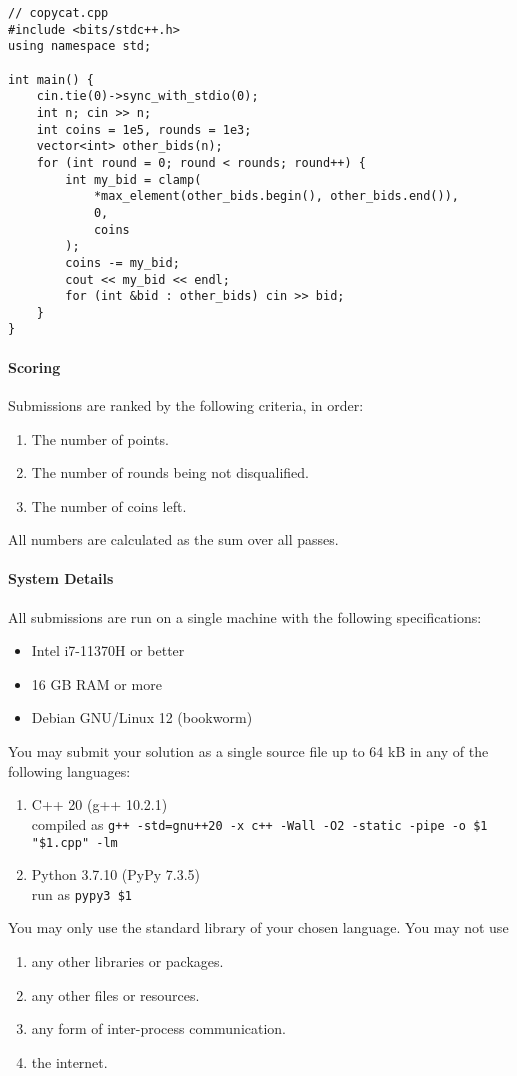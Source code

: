 \documentclass[
    a4paper,
    12pt,
    parskip=half,
    headings=standardclasses,
    footskip=0pt,
    footlines=1,
    headheight=80in
]{scrartcl}
\newcommand{\lgrey}{black!5}
\begin{document}
\begin{verbatim}
// copycat.cpp
#include <bits/stdc++.h>
using namespace std;

int main() {
    cin.tie(0)->sync_with_stdio(0);
    int n; cin >> n;
    int coins = 1e5, rounds = 1e3;
    vector<int> other_bids(n);
    for (int round = 0; round < rounds; round++) {
        int my_bid = clamp(
            *max_element(other_bids.begin(), other_bids.end()),
            0,
            coins
        );
        coins -= my_bid;
        cout << my_bid << endl;
        for (int &bid : other_bids) cin >> bid;
    }
}
\end{verbatim}

\paragraph*{Scoring}\label{scoring}

Submissions are ranked by the following criteria, in order:
\begin{enumerate}
    \item The number of points.
    \item The number of rounds being not disqualified.
    \item The number of coins left.
\end{enumerate}
All numbers are calculated as the sum over all passes.

\paragraph*{System Details} All submissions are run on a single machine with the
following specifications:
\begin{itemize}
    \item Intel i7-11370H or better
    \item 16 GB RAM or more
    \item Debian GNU/Linux 12 (bookworm)
\end{itemize}

You may submit your solution as a single source file up to $64$ kB in any of the following
languages:
\begin{enumerate}
    \raggedright
    \item C++ 20 (g++ 10.2.1)\\[4pt]compiled as \texttt{g++ -std=gnu++20 -x c++ -Wall -O2 -static -pipe -o \$1 "\$1.cpp" -lm}
    \item Python 3.7.10 (PyPy 7.3.5)\\[4pt]run as \texttt{pypy3 \$1}
\end{enumerate}
You may only use the standard library of your chosen language.
You may not use
\begin{enumerate}
    \item any other libraries or packages.
    \item any other files or resources.
    \item any form of inter-process communication.
    \item the internet.
\end{enumerate}
\end{document}
